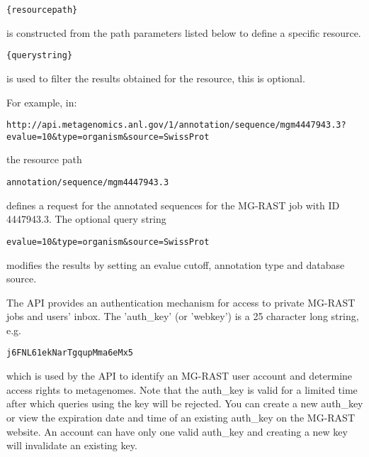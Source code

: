 \begin{small}
\begin{verbatim}
{resourcepath}
\end{verbatim}
\end{small}
is constructed from the path parameters listed below to define a specific resource.

\begin{small}
\begin{verbatim}
{querystring}
\end{verbatim}
\end{small}
is used to filter the results obtained for the resource, this is optional.

For example, in:
\begin{small}
\begin{lstlisting}
http://api.metagenomics.anl.gov/1/annotation/sequence/mgm4447943.3?evalue=10&type=organism&source=SwissProt
\end{lstlisting}
\end{small} the resource path 

\begin{small}
\begin{verbatim}
annotation/sequence/mgm4447943.3
\end{verbatim}
\end{small} defines a request for the annotated sequences for the MG-RAST job with ID 4447943.3. 
The optional query string 

\begin{small}
\begin{verbatim}
evalue=10&type=organism&source=SwissProt
\end{verbatim}
\end{small} modifies the results by setting an evalue cutoff, annotation type and database source.

The API provides an authentication mechanism for access to private MG-RAST jobs and users' inbox. The 'auth\_key' (or 'webkey') is a 25 character long string, e.g.

\begin{small}
\begin{verbatim}
j6FNL61ekNarTgqupMma6eMx5
\end{verbatim}
\end{small} which is used by the API to identify an MG-RAST user account and determine access rights to metagenomes. Note that the auth\_key is valid for a limited time after which queries using the key will be rejected. You can create a new auth\_key or view the expiration date and time of an existing auth\_key on the MG-RAST website. An account can have only one valid auth\_key and creating a new key will invalidate an existing key.

